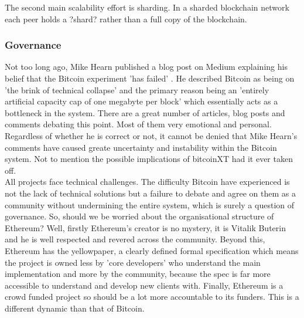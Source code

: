 The second main scalability effort is sharding. In a sharded blockchain network each peer holds a ?shard? rather than a full copy of the blockchain. 


\subsubsection{Governance}
Not too long ago, Mike Hearn published a blog post on Medium explaining his belief that the Bitcoin experiment 'has failed' \cite{HearnBitcoin}. He described Bitcoin as being on 'the brink of technical collapse' and the primary reason being an 'entirely artificial capacity cap of one megabyte per block' which essentially acts as a bottleneck in the system. There are a great number of articles, blog posts and comments debating this point. Most of them very emotional and personal. Regardless of whether he is correct or not, it cannot be denied that Mike Hearn's comments have caused greate uncertainty and instability within the Bitcoin system. Not to mention the possible implications of bitcoinXT\cite{bitcoinXT} had it ever taken off. \\

All projects face technical challenges. The difficulty Bitcoin have experienced is not the lack of technical solutions but a failure to debate and agree on them as a community without undermining the entire system, which is surely a question of governance. So, should we be worried about the organisational structure of Ethereum? Well, firstly Ethereum's creator is no mystery, it is Vitalik Buterin and he is well respected and revered across the community. Beyond this, Ethereum has the yellowpaper\cite{yellowpaper}, a clearly defined formal specification which means the project is owned less by 'core developers' who understand the main implementation and more by the community, because the spec is far more accessible to understand and develop new clients with. Finally, Ethereum is a crowd funded project so should be a lot more accountable to its funders. This is a different dynamic than that of Bitcoin.\\


